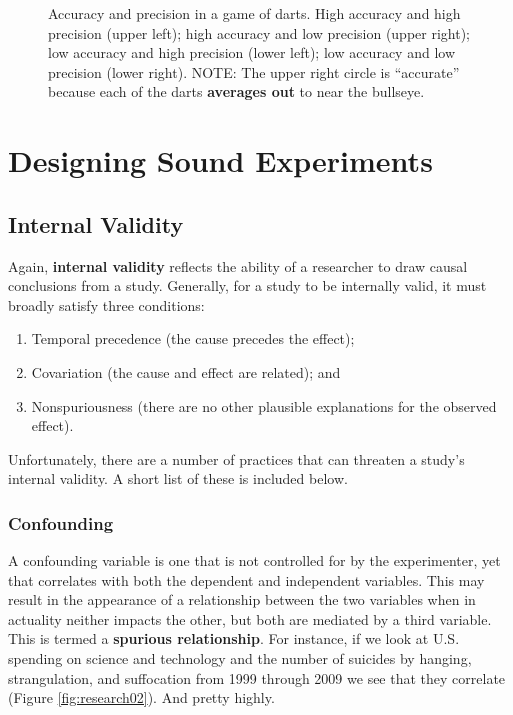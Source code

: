 \begin{figure}[htp]
\caption{Accuracy and precision in a game of darts. High accuracy and high precision (upper left); high accuracy and low precision (upper right); low accuracy and high precision (lower left); low accuracy and low precision (lower right). NOTE: The upper right circle is ``accurate'' because each of the darts \textbf{averages out} to near the bullseye.}
\label{fig:research01}
\end{figure}

\section{Designing Sound Experiments}

\subsection{Internal Validity}
Again, \textbf{internal validity}  reflects the ability of a researcher to draw causal conclusions from a study. Generally, for a study to be internally valid, it must broadly satisfy three conditions:

\begin{enumerate}
  \item Temporal precedence (the cause precedes the effect);
  \item Covariation (the cause and effect are related); and
  \item Nonspuriousness (there are no other plausible explanations for the observed effect).
\end{enumerate}

Unfortunately, there are a number of practices that can threaten a study's internal validity. A short list of these is included below.

\subsubsection{Confounding}
A confounding variable is one that is not controlled for by the experimenter, yet that correlates with both the dependent and independent variables. This may result in the appearance of a relationship between the two variables when in actuality neither impacts the other, but both are mediated by a third variable. This is termed a \textbf{spurious relationship}. For instance, if we look at U.S. spending on science and technology and the number of suicides by hanging, strangulation, and suffocation from 1999 through 2009 we see that they correlate (Figure \ref{fig:research02}). And pretty highly. 

